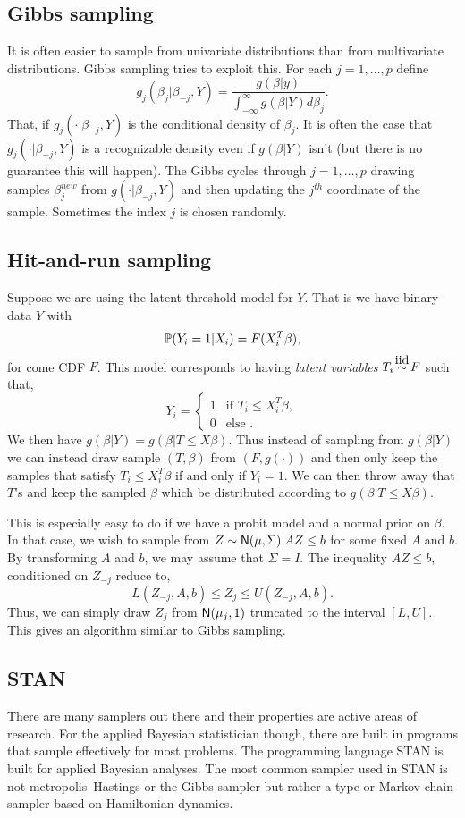 \subsection{Gibbs sampling}
It is often easier to sample from univariate distributions than from multivariate distributions. Gibbs sampling tries to exploit this. For each $j=1,\ldots,p$ define
\[g_j(\beta_j|\beta_{-j},Y) = \frac{g(\beta|y)}{\int_{-\infty}^\infty g(\beta|Y)d\beta_j}. \]
That, if $g_j(\cdot|\beta_{-j},Y)$ is the conditional density of $\beta_j$. It is often the case that $g_j(\cdot|\beta_{-j},Y)$ is a recognizable density even if $g(\beta|Y)$ isn't (but there is no guarantee this will happen). The Gibbs cycles through $j=1,\ldots,p$ drawing samples $\beta_j^{new}$ from $g(\cdot|\beta_{-j},Y)$ and then updating the $j^{th}$ coordinate of the sample. Sometimes the index $j$ is chosen randomly.

\subsection{Hit-and-run sampling}
Suppose we are using the latent threshold model for $Y$. That is we have binary data $Y$ with \[{\mathbb{P}}(Y_i=1|X_i) = F(X_i^T\beta),\]for come CDF $F$. This model corresponds to having \emph{latent variables} $T_i \iid F$ such that,
\[Y_i = \begin{cases}
    1 & \text{if } T_i \le X_i^T\beta,\\
    0 & \text{else }.
\end{cases} \] 
We then have $g(\beta|Y) = g(\beta|T \le X\beta)$. Thus instead of sampling from $g(\beta|Y)$ we can instead draw sample $(T,\beta)$ from $(F,g(\cdot))$ and then only keep the samples that satisfy $T_i \le X_i^T\beta$ if and only if $Y_i = 1$. We can then throw away that $T$'s and keep the sampled $\beta$ which be distributed according to $g(\beta|T\le X\beta)$.  

This is especially easy to do if we have a probit model and a normal prior on $\beta$. In that case, we wish to sample from $Z \sim \mathsf{N}(\mu,\Sigma)|AZ\le b$ for some fixed $A$ and $b$. By transforming $A$ and $b$, we may assume that $\Sigma = I$. The inequality $AZ\le b$, conditioned on $Z_{-j}$ reduce to,
\[L(Z_{-j}, A, b) \le Z_j \le U(Z_{-j},A,b). \]
Thus, we can simply draw $Z_j$ from $\mathsf{N}(\mu_j,1)$ truncated to the interval $[L,U]$. This gives an algorithm similar to Gibbs sampling.

\subsection{STAN}
There are many samplers out there and their properties are active areas of research. For the applied Bayesian statistician though, there are built in programs that sample effectively for most problems. The programming language STAN is built for applied Bayesian analyses. The most common sampler used in STAN is not metropolis--Hastings or the Gibbs sampler but rather a type or Markov chain sampler based on Hamiltonian dynamics. 

